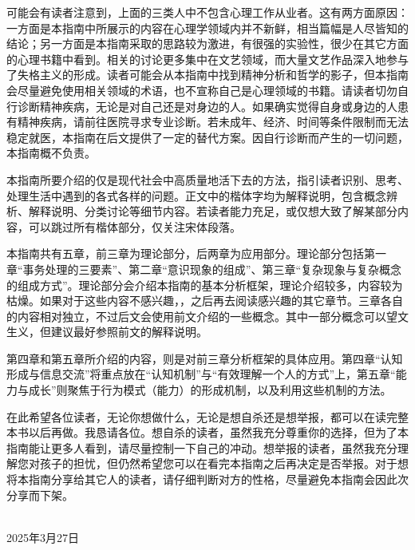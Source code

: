 可能会有读者注意到，上面的三类人中不包含心理工作从业者。这有两方面原因：一方面是本指南中所展示的内容在心理学领域内并不新鲜，相当篇幅是人尽皆知的结论；另一方面是本指南采取的思路较为激进，有很强的实验性，很少在其它方面的心理书籍中看到。相关的讨论更多集中在文艺领域，而大量文艺作品深入地参与了失格主义的形成。读者可能会从本指南中找到精神分析和哲学的影子，但本指南会尽量避免使用相关领域的术语，也不宣称自己是心理领域的书籍。请读者切勿自行诊断精神疾病，无论是对自己还是对身边的人。如果确实觉得自身或身边的人患有精神疾病，请前往医院寻求专业诊断。若未成年、经济、时间等条件限制而无法稳定就医，本指南在后文提供了一定的替代方案。因自行诊断而产生的一切问题，本指南概不负责。

本指南所要介绍的仅是现代社会中高质量地活下去的方法，指引读者识别、思考、处理生活中遇到的各式各样的问题。正文中的楷体字均为解释说明，包含概念辨析、解释说明、分类讨论等细节内容。若读者能力充足，或仅想大致了解某部分内容，可以跳过所有楷体部分，仅关注宋体段落。

本指南共有五章，前三章为理论部分，后两章为应用部分。理论部分包括第一章“事务处理的三要素”、第二章“意识现象的组成”、第三章“复杂现象与复杂概念的组成方式”。理论部分会介绍本指南的基本分析框架，理论介绍较多，内容较为枯燥。如果对于这些内容不感兴趣，\hyperref[chap:midterm]{}，之后再去阅读感兴趣的其它章节。三章各自的内容相对独立，不过后文会使用前文介绍的一些概念。其中一部分概念可以望文生义，但建议最好参照前文的解释说明。

第四章和第五章所介绍的内容，则是对前三章分析框架的具体应用。第四章“认知形成与信息交流”将重点放在“认知机制”与“有效理解一个人的方式”上，第五章“能力与成长”则聚焦于行为模式（能力）的形成机制，以及利用这些机制的方法。

在此希望各位读者，无论你想做什么，无论是想自杀还是想举报，都可以在读完整本书以后再做。我恳请各位。想自杀的读者，虽然我充分尊重你的选择，但为了本指南能让更多人看到，请尽量控制一下自己的冲动。想举报的读者，虽然我充分理解您对孩子的担忧，但仍然希望您可以在看完本指南之后再决定是否举报。对于想将本指南分享给其它人的读者，请仔细判断对方的性格，尽量避免本指南会因此次分享而下架。

\hfill
\begin{minipage}{0.3\textwidth}
    \begin{flushright}
        \authorname \\
        2025年3月27日%
    \end{flushright}
\end{minipage}